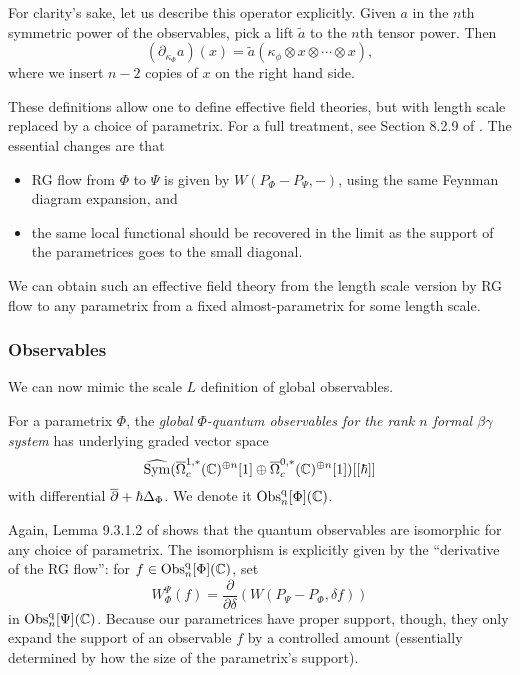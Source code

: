 For clarity's sake, let us describe this operator explicitly.
Given $a$ in the $n$th symmetric power of the observables, pick a lift $\tilde{a}$ to the $n$th tensor power.
Then 
\[
(\partial_{\kappa_\Phi}a)(x) = \tilde{a}(\kappa_\phi \otimes x \otimes \cdots \otimes x),
\]
where we insert $n-2$ copies of $x$ on the right hand side.

These definitions allow one to define effective field theories, but with length scale replaced by a choice of parametrix.
For a full treatment, see Section 8.2.9 of \cite{CG2}.
The essential changes are that 
\begin{itemize}
\item RG flow from $\Phi$ to $\Psi$ is given by $W(P_\Phi - P_\Psi,-)$, using the same Feynman diagram expansion, and
\item the same local functional should be recovered in the limit as the support of the parametrices goes to the small diagonal.
\end{itemize} 
We can obtain such an effective field theory from the length scale version 
by RG flow to any parametrix from a fixed almost-parametrix for some length scale.

\subsubsection{Observables}

We can now mimic the scale $L$ definition of global observables.

\begin{dfn}
For a parametrix $\Phi$, the  \emph{global $\Phi$-quantum observables for the rank $n$ formal $\beta\gamma$ system} 
has underlying graded vector space  
\[
\widehat{{\rm Sym}}(\overline{\Omega}_c^{1,*}(\mathbb C)^{\oplus n}[1] \oplus \overline{\Omega}^{0,*}_c(\mathbb C)^{\oplus n}[1])[[\hbar]]
\]
with differential $\overline{\partial} + \hbar \Delta_\Phi$. 
We denote it ${\rm Obs}^{\rm q}_n[\Phi](\mathbb C)$.
\end{dfn}

Again, Lemma 9.3.1.2 of \cite{CG2} shows that the quantum observables are isomorphic for any choice of parametrix.
The isomorphism is explicitly given by the ``derivative of the RG flow'':
for $f \in {\rm Obs}^{\rm q}_n[\Phi](\mathbb C)$, set
\[
W_\Phi^\Psi(f) = \frac{\partial}{\partial \delta}(W(P_\Psi - P_\Phi, \delta f)) 
\]
in ${\rm Obs}^{\rm q}_n[\Psi](\mathbb C)$.
Because our parametrices have proper support, though, they only expand the support of an observable $f$ by a controlled amount 
(essentially determined by how the size of the parametrix's support).


